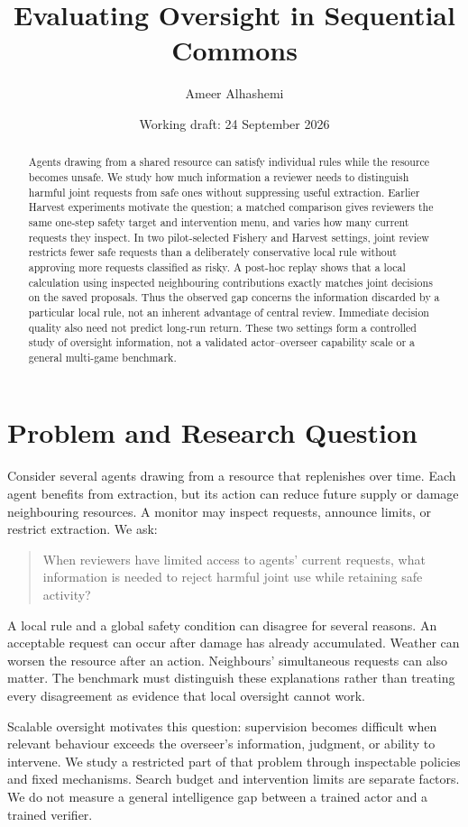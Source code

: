 \documentclass[10pt]{article}
\title{Evaluating Oversight in Sequential Commons}
\author{Ameer Alhashemi}
\date{Working draft: 24 September 2026}
\begin{document}
\maketitle
\begin{abstract}
Agents drawing from a shared resource can satisfy individual rules while the resource becomes unsafe. We study how much information a reviewer needs to distinguish harmful joint requests from safe ones without suppressing useful extraction. Earlier Harvest experiments motivate the question; a matched comparison gives reviewers the same one-step safety target and intervention menu, and varies how many current requests they inspect. In two pilot-selected Fishery and Harvest settings, joint review restricts fewer safe requests than a deliberately conservative local rule without approving more requests classified as risky. A post-hoc replay shows that a local calculation using inspected neighbouring contributions exactly matches joint decisions on the saved proposals. Thus the observed gap concerns the information discarded by a particular local rule, not an inherent advantage of central review. Immediate decision quality also need not predict long-run return. These two settings form a controlled study of oversight information, not a validated actor--overseer capability scale or a general multi-game benchmark.
\end{abstract}

\section{Problem and Research Question}
Consider several agents drawing from a resource that replenishes over time. Each agent benefits from extraction, but its action can reduce future supply or damage neighbouring resources. A monitor may inspect requests, announce limits, or restrict extraction. We ask:
\begin{quote}
When reviewers have limited access to agents' current requests, what information is needed to reject harmful joint use while retaining safe activity?
\end{quote}
A local rule and a global safety condition can disagree for several reasons. An acceptable request can occur after damage has already accumulated. Weather can worsen the resource after an action. Neighbours' simultaneous requests can also matter. The benchmark must distinguish these explanations rather than treating every disagreement as evidence that local oversight cannot work.

Scalable oversight motivates this question: supervision becomes difficult when relevant behaviour exceeds the overseer's information, judgment, or ability to intervene. We study a restricted part of that problem through inspectable policies and fixed mechanisms. Search budget and intervention limits are separate factors. We do not measure a general intelligence gap between a trained actor and a trained verifier.
\end{document}
